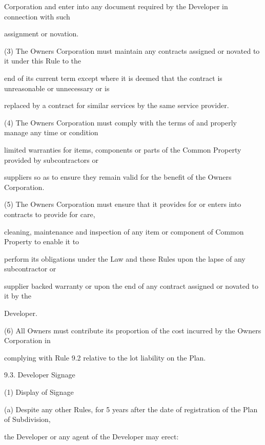 \documentclass{article}
\begin{document}
{\fontsize{10.02}{1}Corporation and enter into any document required by the Developer in connection with such }

{\fontsize{10.02}{1}assignment or novation. }

{\fontsize{9.962}{1}(3) The Owners Corporation must maintain any contracts assigned or novated to it under this Rule to the }

{\fontsize{10.02}{1}end of its current term except where it is deemed that the contract is unreasonable or unnecessary or is }

{\fontsize{10.02}{1}replaced by a contract for similar services by the same service provider. }


{\fontsize{9.962}{1}(4) The Owners Corporation must comply with the terms of and properly manage any time or condition }

{\fontsize{10.02}{1}limited warranties for items, components or parts of the Common Property provided by subcontractors or }

{\fontsize{10.02}{1}suppliers so as to ensure they remain valid for the benefit of the Owners Corporation. }

{\fontsize{9.962}{1}(5) The Owners Corporation must ensure that it provides for or enters into contracts to provide for care, }

{\fontsize{10.02}{1}cleaning, maintenance and inspection of any item or component of Common Property to enable it to }

{\fontsize{10.02}{1}perform its obligations under the Law and these Rules upon the lapse of any subcontractor or }

{\fontsize{10.02}{1}supplier backed warranty or upon the end of any contract assigned or novated to it by the }

{\fontsize{10.02}{1}Developer. }

{\fontsize{9.962}{1}(6) All Owners must contribute its proportion of the cost incurred by the Owners Corporation in }

{\fontsize{10.02}{1}complying with Rule 9.2 relative to the lot liability on the Plan. }

{\fontsize{9.99}{1}9.3. Developer Signage }

{\fontsize{9.962}{1}(1) Display of Signage }

{\fontsize{9.962}{1}(a) Despite any other Rules, for 5 years after the date of registration of the Plan of Subdivision, }

{\fontsize{10.02}{1}the Developer or any agent of the Developer may erect: }
\end{document}
